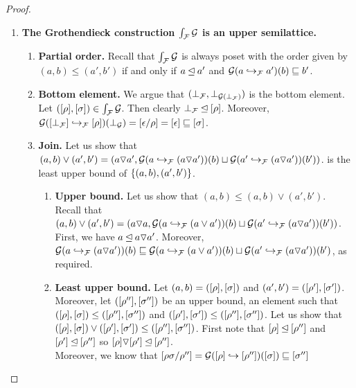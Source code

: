 \begin{proof}
\begin{enumerate}
\item {\bf The Grothendieck construction $\grothy{\ulbF}{\ulbG}$ is an upper semilattice.}
  \begin{enumerate}
  \item {\bf Partial order.}
    Recall that $\grothy{\ulbF}{\ulbG}$ is always poset
    with the order given by $(a,b) \leq (a',b')$ if and only if
    $a \leqF a'$ and $\ulbG(\ptF{a'}{a})(b) \permle b'$.
  \item {\bf Bottom element.}
    We argue that $(\bot_{\ulbF},\bot_{\ulbG(\bot_\ulbF)})$ is the bottom
    element. Let $(\cls{\redseq},\cls{\redseqtwo}) \in \grothy{\ulbF}{\ulbG}$.
    Then clearly $\bot_{\ulbF} \leqF \cls{\redseq}$. Moreover,
    $
     \ulbG(\ptF{[\redseq]}{[\bot_{\ulbF}]})(\bot_\ulbG) =
     [\emptyDerivation/\redseq] = [\emptyDerivation] \permle \cls{\redseqtwo}
    $.
  \item {\bf Join.}
    Let us show that $(a, b) \lor (a',b') = (a \lorF a', \ulbG(\ptF{(a \lorF a')}{a})(b) \sqcup \ulbG(\ptF{(a \lorF a')}{a'})(b'))$.
    is the least upper bound of $\set{(a, b), (a',b')}$.
    \begin{enumerate}
    \item {\bf Upper bound.}
      Let us show that $(a, b) \leq (a, b) \lor (a',b')$.
      Recall that $(a, b) \lor (a', b') = (a \lorF a, \ulbG(\ptF{(a \lor a')}{a})(b) \sqcup \ulbG(\ptF{(a \lorF a')}{a'})(b'))$.
      First, we have $a \leqF a \lorF a'$.
      Moreover, $\ulbG(\ptF{(a \lorF a')}{a})(b) \permle \ulbG(\ptF{(a \lor a')}{a})(b) \sqcup \ulbG(\ptF{(a \lorF a')}{a'})(b')$, as required.
    \item {\bf Least upper bound.}
      Let $(a,b) = (\cls{\redseq},\cls{\redseqtwo})$
      and $(a',b') = (\cls{\redseq'},\cls{\redseqtwo'})$.
      Moreover, let $(\cls{\redseq''},\cls{\redseqtwo''})$ be an upper bound,
      \ie an element
      such that $(\cls{\redseq},\cls{\redseqtwo}) \leq (\cls{\redseq''},\cls{\redseqtwo''})$
      and $(\cls{\redseq'},\cls{\redseqtwo'}) \leq (\cls{\redseq''},\cls{\redseqtwo''})$.
      Let us show that
      $(\cls{\redseq},\cls{\redseqtwo}) \lor (\cls{\redseq'},\cls{\redseqtwo'}) \leq (\cls{\redseq''},\cls{\redseqtwo''})$.
      First note that $\cls{\redseq} \leqF \cls{\redseq''}$ and $\cls{\redseq'} \leqF \cls{\redseq''}$
      so $\cls{\redseq} \lorF \cls{\redseq'} \leqF \cls{\redseq''}$.\\
      Moreover, we know that $\cls{\redseq\redseqtwo/\redseq''} = \ulbG(\pt{\cls{\redseq''}}{\cls{\redseq}})(\cls{\redseqtwo}) \permle \cls{\redseqtwo''}$

\end{enumerate}
\end{enumerate}
\end{enumerate}
\end{proof}
